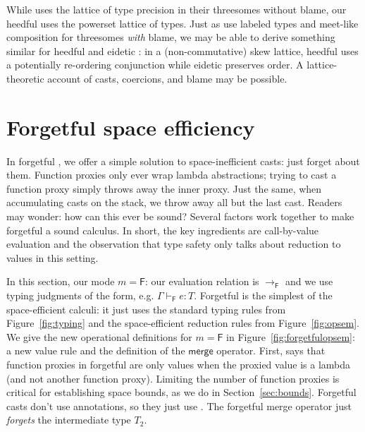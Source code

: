 \documentclass[9pt]{extarticle}
\newcommand{\ottnt}[1]{\mathit{#1}}
\newcommand{\ottsym}[1]{#1}
\begin{document}
{While \citet{Siek10threesomes} uses the lattice of type precision in
their threesomes without blame, our heedful \lambdah uses the powerset
lattice of types.
Just as \citeauthor{Siek10threesomes} use labeled types and meet-like
composition for threesomes \textit{with} blame, we may be able to
derive something similar for heedful and eidetic \lambdah: in a
(non-commutative) skew lattice, heedful uses a potentially re-ordering
conjunction while eidetic preserves order. A lattice-theoretic account
of casts, coercions, and blame may be possible.

\section{Forgetful space efficiency}
\label{sec:forgetful}

In forgetful \lambdah, we offer a simple solution to space-inefficient
casts: just forget about them. Function proxies only ever wrap
lambda abstractions; trying to cast a function proxy simply throws
away the inner proxy.
Just the same, when accumulating casts on the stack, we throw away all but the
last cast.
Readers may wonder: how can this ever be sound? Several factors work
together to make forgetful \lambdah a sound calculus. In short, the
key ingredients are call-by-value evaluation and the observation that
type safety only talks about reduction to values in this setting.

In this section, our mode $\ottnt{m}  \ottsym{=}   \mathsf{F} $: our evaluation relation is $ \longrightarrow _{  \mathsf{F}  } $
and we use typing judgments of the form, e.g. $ \Gamma   \vdash _{  \mathsf{F}  }  \ottnt{e}  :  \ottnt{T} $.
Forgetful \lambdah is the simplest of the space-efficient calculi: it
just uses the standard typing rules from Figure~\ref{fig:typing} and
the space-efficient reduction rules from Figure~\ref{fig:opsem}. 
We give the new operational definitions for $\ottnt{m}  \ottsym{=}   \mathsf{F} $ in
Figure~\ref{fig:forgetfulopsem}: a new value rule and the definition
of the $ \mathsf{merge} $ operator.
First,  says that function proxies in forgetful \lambdah are
only values when the proxied value is a lambda (and not another
function proxy).  Limiting the number of
function proxies is critical for establishing space bounds, as we do
in Section~\ref{sec:bounds}.
Forgetful casts don't use annotations, so they just use .
The forgetful merge operator just \textit{forgets} the intermediate
type $\ottnt{T_{{\mathrm{2}}}}$.

\begin{figure}[t]
  \hdr{Values and merging}{\qquad \fbox{$ \mathsf{val} _{  \mathsf{F}  }~ \ottnt{e} $}}


\end{figure}}
\end{document}
